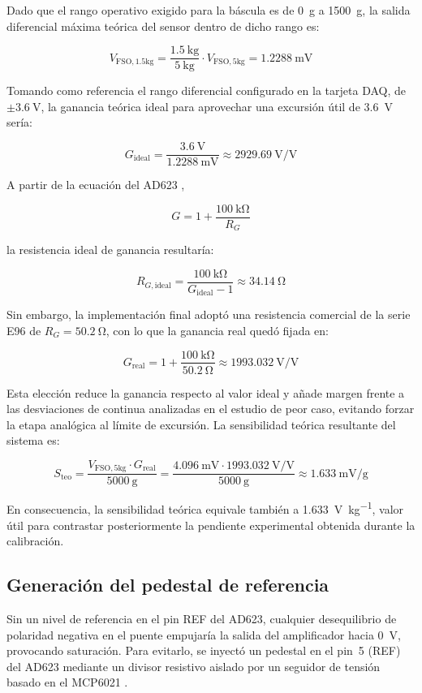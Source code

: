 Dado que el rango operativo exigido para la báscula es de \SI{0}{\g} a \SI{1500}{\g}, la salida diferencial máxima teórica del sensor dentro de dicho rango es:

\[
    V_{\mathrm{FSO,1.5kg}} = \frac{\SI{1.5}{\kg}}{\SI{5}{\kg}} \cdot V_{\mathrm{FSO,5kg}}
    = \SI{1.2288}{\milli\V}
\]

Tomando como referencia el rango diferencial configurado en la tarjeta DAQ, de $\pm\SI{3.6}{\V}$, la ganancia teórica ideal para aprovechar una excursión útil de \SI{3.6}{\V} sería:

\[
    G_{\mathrm{ideal}} = \frac{\SI{3.6}{\V}}{\SI{1.2288}{\milli\V}}
    \approx \SI{2929.69}{\V\per\V}
\]

A partir de la ecuación del AD623 \cite{ad623_datasheet},

\[
    G = 1 + \frac{\SI{100}{\kilo\ohm}}{R_G}
\]

la resistencia ideal de ganancia resultaría:

\[
    R_{G,\mathrm{ideal}} = \frac{\SI{100}{\kilo\ohm}}{G_{\mathrm{ideal}} - 1}
    \approx \SI{34.14}{\ohm}
\]

Sin embargo, la implementación final adoptó una resistencia comercial de la serie E96 de $R_G = \SI{50.2}{\ohm}$, con lo que la ganancia real quedó fijada en:

\[
    G_{\mathrm{real}} = 1 + \frac{\SI{100}{\kilo\ohm}}{\SI{50.2}{\ohm}}
    \approx \SI{1993.032}{\V\per\V}
\]

Esta elección reduce la ganancia respecto al valor ideal y añade margen frente a las desviaciones de continua analizadas en el estudio de peor caso, evitando forzar la etapa analógica al límite de excursión. La sensibilidad teórica resultante del sistema es:

\[
    S_{\mathrm{teo}} = \frac{V_{\mathrm{FSO,5kg}} \cdot G_{\mathrm{real}}}{\SI{5000}{\g}}
    = \frac{\SI{4.096}{\milli\V} \cdot \SI{1993.032}{\V\per\V}}{\SI{5000}{\g}}
    \approx \SI{1.633}{\milli\V\per\g}
\]

En consecuencia, la sensibilidad teórica equivale también a \SI{1.633}{\V\per\kg}, valor útil para contrastar posteriormente la pendiente experimental obtenida durante la calibración.

\subsection{Generación del pedestal de referencia}

Sin un nivel de referencia en el pin REF del AD623, cualquier desequilibrio de polaridad negativa en el puente empujaría la salida del amplificador hacia \SI{0}{\V}, provocando saturación. Para evitarlo, se inyectó un pedestal en el pin~5 (REF) del AD623 mediante un divisor resistivo aislado por un seguidor de tensión basado en el MCP6021 \cite{mcp6021_datasheet}.

